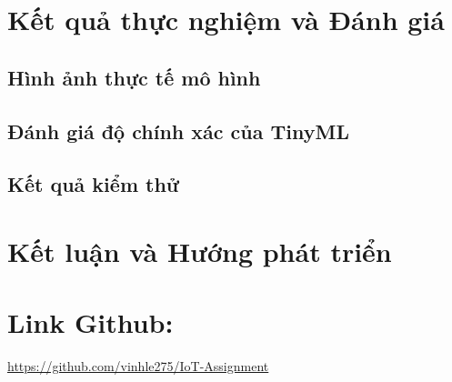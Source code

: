 \documentclass[a4paper,12pt]{article}
\begin{document}


\section{Kết quả thực nghiệm và Đánh giá}
\subsection{Hình ảnh thực tế mô hình}

\subsection{Đánh giá độ chính xác của TinyML}

\subsection{Kết quả kiểm thử}


\section{Kết luận và Hướng phát triển}


\section*{Link Github:}
\href{https://github.com/vinhle275/IoT-Assignment}{https://github.com/vinhle275/IoT-Assignment}
\end{document}
